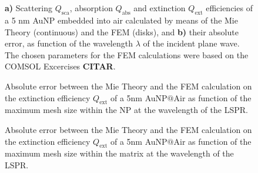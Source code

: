 %
\begin{figure}[h!]
\def\svgwidth{\textwidth} \small
\hspace*{2em}
\begin{subfigure}{.1\textwidth}\caption{ }\label{fig:Eff:sphere:First:a}\end{subfigure}
\vspace*{12.5em} %
\\
\vspace*{-16.5em} %
\hspace*{2em}%
\begin{subfigure}{.1\textwidth}\caption{ }\label{fig:Eff:sphere:First:b}\end{subfigure}\\
\vspace*{-1.5em} %
\caption[Scattering, Absorption and Extinction Efficiencies of a 5 nm AuNP$@$Air: Analytical and FEM solutions with no optimizatio]{\textbf{a)} Scattering $Q_\text{sca}$, absorption $Q_\text{abs}$ and extinction $Q_\text{ext}$ efficiencies of a 5 nm AuNP embedded into air calculated by means of the Mie Theory (continuous) and the FEM (disks), and \textbf{b)} their absolute error, as function of the wavelength $\lambda$ of the incident plane wave. The chosen parameters for the FEM calculations were based on the COMSOL Excercises \textbf{CITAR}.}
\label{fig:Eff:sphere:First}
\end{figure}


%
\begin{figure}[h!]\centering
	\def\svgwidth{\textwidth} \small
{}
\vspace*{-1em}
\caption[Extinction Efficiency Absolute Error: NP Max Mesh Size Analysis]{Absolute error between the Mie Theory and the FEM calculation on the extinction efficiency $Q_\text{ext}$ of a 5nm AuNP$@$Air as function of the maximum mesh size within the NP at the wavelength of the LSPR.}
\label{fig:Eff:sphere:radius}
\end{figure}

%
\begin{figure}[h!]\centering
	\def\svgwidth{\textwidth} \small
{}
\vspace*{-1em}
\caption[Extinction Efficiency Absolute Error: Matrix Max Mesh Size Analysis]{Absolute error between the Mie Theory and the FEM calculation on the extinction efficiency $Q_\text{ext}$ of a 5nm AuNP$@$Air as function of the maximum mesh size within the matrix at the wavelength of the LSPR.}
\label{fig:Eff:sphere:matrix}
\end{figure}


